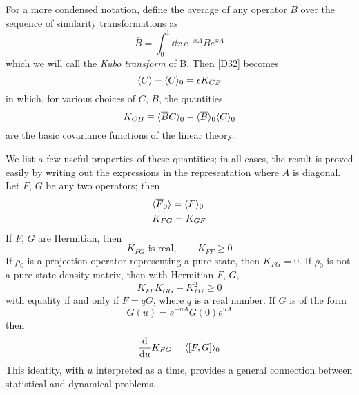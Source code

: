 For a more condensed notation, define the average of any operator $B$ over the sequence of similarity transformations as
\begin{equation}
	\label{D33}
	\bar{B} = \int_{0}^{1}\! \dd x \, e^{-x A} B e^{x A}
\end{equation}
which we will call the \emph{Kubo transform} of B.
Then \eqref{D32} becomes
\begin{equation}
	\label{D34}
	\langle C\rangle - \langle C\rangle_0 = \epsilon K_{CB}
\end{equation}
in which, for various choices of $C$, $B$, the quantities
\begin{equation}
	K_{CB} \equiv \langle\overline{B} C\rangle_0 - \langle\overline{B}\rangle_0 \langle C\rangle_0
\end{equation}
are the basic covariance functions of the linear theory.

We list a few useful properties of these quantities; in all cases, the result is proved easily by writing out the expressions in the representation where $A$ is diagonal.
Let $F$, $G$ be any two operators; then
\begin{align}
	&\langle\overline{F}_0\rangle = \langle F\rangle_0\\
	&K_{FG} = K_{GF}\label{D37}
\end{align}
If $F$, $G$ are Hermitian, then
\begin{equation}
	K_{FG} \text{ is real}, \qquad K_{FF} \geq 0
\end{equation}
If $\rho_0$ is a projection operator representing a pure state, then $K_{FG} = 0$.
If $\rho_0$ is not a pure state density matrix, then with Hermitian $F$, $G$,
\begin{equation}
	K_{FF} K_{GG}  -  K_{FG}^2 \geq 0
\end{equation}
with equality if and only if $F = qG$, where $q$ is a real number.
If $G$ is of the form
\begin{equation}
	G(u) = e^{-uA} G(0) e^{uA}
\end{equation}
then
\begin{equation}
	\label{D41}
	\odv*{K_{FG}}{u} = \mean{[F, G]}_0
\end{equation}
This identity, with $u$ interpreted as a time, provides a general connection between statistical and dynamical problems.


